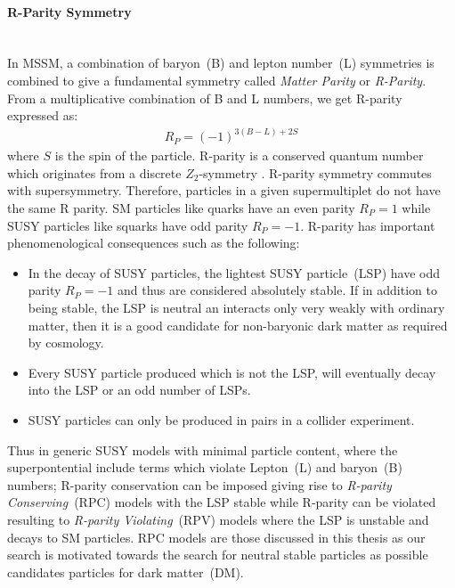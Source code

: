 \paragraph*{R-Parity Symmetry}\mbox{}\\
In MSSM, a combination of baryon~(B) and lepton number~(L) symmetries is combined to give a fundamental symmetry called  \textit{Matter Parity} or \textit{R-Parity}.
From a multiplicative combination of B and L numbers, we get R-parity expressed as:
\begin{align}
R_{P} = \left(-1\right)^{3(B-L) + 2S}
\end{align} 
where $S$ is the spin of the particle.
R-parity is a conserved quantum number which originates from a discrete $Z_{2}$-symmetry \cite{SM}. R-parity symmetry commutes with supersymmetry. Therefore, particles in a given supermultiplet do not have the same R parity.
SM particles like quarks have an even parity $R_{P} = 1$ while SUSY particles like squarks have odd parity $R_{P} = -1$.
R-parity has important phenomenological consequences such as the following:
\begin{itemize}
\item In the decay of SUSY particles, the lightest SUSY particle~(LSP) have odd parity $R_{P} =-1$ and thus are considered absolutely stable. If in addition to being stable, the LSP is neutral an interacts only very weakly with ordinary matter, then it is a good candidate for non-baryonic dark matter as required by cosmology\cite{LSPDM}.
\item Every SUSY particle produced which is not the LSP, will eventually decay into the LSP or an odd number of LSPs.
\item SUSY particles can only be produced in pairs in a collider experiment.
\end{itemize}
Thus in generic SUSY models with minimal particle content, where the superpontential include terms which violate Lepton~(L) and baryon~(B) numbers; R-parity conservation can be imposed giving rise to \textit{R-parity Conserving}~(RPC) models with the LSP stable while R-parity can be violated resulting to \textit{R-parity Violating}~(RPV) models where the LSP is unstable and decays to SM particles.
\newline
RPC models are those discussed in this thesis as our search is motivated towards the search for neutral stable particles as possible candidates particles for dark matter~(DM).
